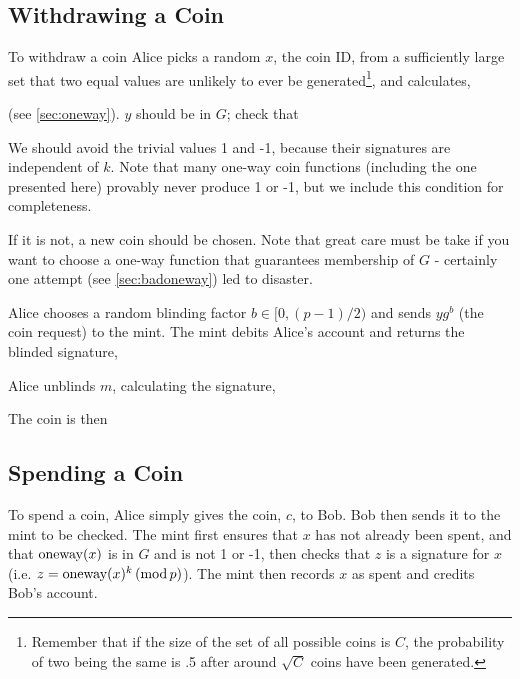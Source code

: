 \documentclass[a4paper,titlepage]{article}
\begin{document}
\subsection{Withdrawing a Coin}

To withdraw a coin Alice picks a random $x$, the coin ID, from a
sufficiently large set that two equal values are unlikely to ever be
generated\footnote{Remember that if the size of the set of all
possible coins is $C$, the probability of two being the same is .5
after around $\sqrt{C}$ coins have been generated.}, and calculates,


(see \ref{sec:oneway}). $y$ should be in $G$; check that


We should avoid the trivial values 1 and -1, because their signatures
are independent of $k$. Note that many one-way coin functions
(including the one presented here) provably never produce 1 or -1, but
we include this condition for completeness.


If it is not, a new coin should be chosen. Note that great care must
be take if you want to choose a one-way function that guarantees
membership of $G$ - certainly one attempt (see \ref{sec:badoneway})
led to disaster.

Alice chooses a random blinding factor $b \in [0,(p-1)/2)$ and sends
$y g^b$ (the coin request) to the mint. The mint debits Alice's
account and returns the blinded signature,


Alice unblinds $m$, calculating the signature,


The coin is then


\subsection{Spending a Coin}

To spend a coin, Alice simply gives the coin, $c$, to Bob. Bob then
sends it to the mint to be checked. The mint first ensures that $x$
has not already been spent, and that $\textrm{oneway}(x)$ is in $G$ and is not
1 or -1, then checks that $z$ is a signature for $x$
(i.e. $z=\textrm{oneway}(x)^k \,(\textrm{mod}\,p)$). The mint then records $x$ as spent and
credits Bob's account.
\end{document}
